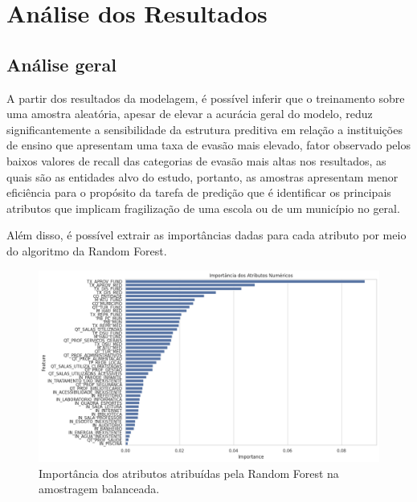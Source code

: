 \section{Análise dos Resultados}

\subsection{Análise geral}

\par A partir dos resultados da modelagem, é possível inferir que o treinamento sobre uma amostra aleatória, apesar de elevar a acurácia geral do modelo, reduz significantemente a sensibilidade da estrutura preditiva em relação a instituições de ensino que apresentam uma taxa de evasão mais elevado, fator observado pelos baixos valores de recall das categorias de evasão mais altas nos resultados, as quais são as entidades alvo do estudo, portanto, as amostras apresentam menor eficiência para o propósito da tarefa de predição que é identificar os principais atributos que implicam fragilização de uma escola ou de um município no geral.

\par Além disso, é possível extrair as importâncias dadas para cada atributo por meio do algoritmo da Random Forest.

\begin{figure}[H]
    \centering
    \includegraphics[scale = 0.4]{Graphics/Import-Bal.png}
    \caption{Importância dos atributos atribuídas pela Random Forest na amostragem balanceada.}
    \label{fig:enter-label}
\end{figure}

